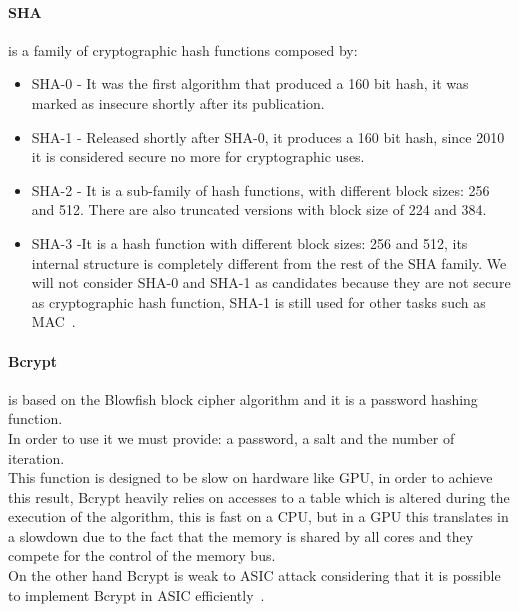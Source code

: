 \paragraph{SHA} is a family of cryptographic hash functions composed by:
\begin{itemize}
	\item SHA-0 - It was the first algorithm that produced a 160 bit hash, it was marked as insecure shortly after its publication.
	\item SHA-1 - Released shortly after SHA-0, it produces a 160 bit hash, since 2010 it is considered secure no more for cryptographic uses.
	\item SHA-2 - It is a sub-family of hash functions, with different block sizes: 256 and 512.
	There are also truncated versions with block size of 224 and 384.
	\item SHA-3 -It is a hash function with different block sizes: 256 and 512, its internal structure is completely different from the rest of the SHA family.
	We will not consider SHA-0 and SHA-1 as candidates because they are not secure as cryptographic hash function, SHA-1 is still used for other tasks such as MAC~\cite{sha}.
\end{itemize}


\paragraph{Bcrypt} is based on the Blowfish block cipher algorithm and it is a password hashing function.\\
In order to use it we must provide: a password, a salt and the number of iteration.\\
This function is designed to be slow on hardware like GPU, in order to achieve this result, Bcrypt heavily relies on accesses to a table which is altered during the execution of the algorithm, this is fast on a CPU, but in a GPU this translates in a slowdown due to the fact that the memory is shared by all cores and they compete for the control of the memory bus.\\
On the other hand Bcrypt is weak to ASIC attack considering that it is possible to implement Bcrypt in ASIC efficiently~\cite{bcrypt}.


